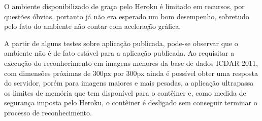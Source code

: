 O ambiente disponibilizado de graça pelo Heroku é limitado em recursos, por questões óbvias, portanto já não era esperado 
um bom desempenho, sobretudo pelo fato do ambiente não contar com aceleração gráfica.

A partir de alguns testes sobre aplicação publicada, pode-se observar que o ambiente não é de fato estável para a aplicação publicada. 
Ao requisitar a execução do reconhecimento em imagens menores da base de dados ICDAR 2011, com dimensões próximas de 300px por 300px 
ainda é possível obter uma resposta do servidor, porém para imagens maiores e mais pesadas, a aplicação ultrapassa os limites de 
memória que tem disponível para o contêiner e, como medida de segurança imposta pelo Heroku, o contêiner é desligado sem conseguir 
terminar o processo de reconhecimento.
